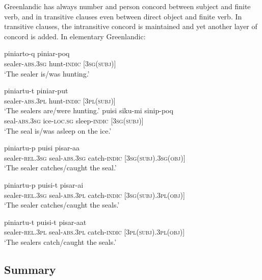 \documentclass[output=paper]{langscibook}
\begin{document}
Greenlandic has always number and person concord between subject and finite verb, and in transitive clauses even between direct object and finite verb. In transitive clauses, the intransitive concord is maintained and yet another layer of concord is added. In elementary Greenlandic:  

\ea \label{ex:heltoft:38} \ea 
    \gll piniarto-q       piniar-poq \label{ex:heltoft:38a}\\
        sealer-\textsc{abs.3sg}  hunt-\textsc{indic} [3\textsc{sg(subj)]}\\
    \glt ‘The sealer is/was hunting.'

\ex \label{ex:heltoft:38b}
    \gll piniartu-t     piniar-put\\
         sealer-\textsc{abs.3pl}  hunt-\textsc{indic} [3\textsc{pl(subj)]}\\
    \glt ‘The sealers are/were hunting.'
\z\ex \label{ex:heltoft:39} \ea
    \gll puisi        siku-mi        sinip-poq  \label{ex:heltoft:39a} \\
         seal-\textsc{abs.3sg}    ice\textsc{{}-loc.sg} sleep\textsc{{}-indic [}3\textsc{sg(subj)]}\\
    \glt ‘The seal is/was asleep on the ice.'

\ex \label{ex:heltoft:39b}
    \gll piniartu-p     puisi           pisar-aa   \\
         sealer-\textsc{rel.3sg}  seal-\textsc{abs.3sg}       catch-\textsc{indic} [3\textsc{sg(subj).}3\textsc{sg(obj)]}\\
    \glt ‘The sealer catches/caught the seal.'

\ex \label{ex:heltoft:39c}
    \gll piniartu-p     puisi-t        pisar-ai\\
        sealer-\textsc{rel.3sg}  seal-\textsc{abs.3pl}     catch-\textsc{indic} [3\textsc{sg(subj).}3\textsc{pl(obj)]}\\
    \glt ‘The sealer catches/caught the seals.'
    
\ex \label{ex:heltoft:39d}
    \gll piniartu-t     puisi-t        pisar-aat\\
        sealer-\textsc{rel.3pl}  seal-\textsc{abs.3pl}     catch-\textsc{indic} \textsc{[3pl(subj).}3\textsc{pl(obj)]}\\
    \glt ‘The sealers catch/caught the seals.'
\z\z

\subsection{Summary} \label{heltoft:3.4}
\end{document}

